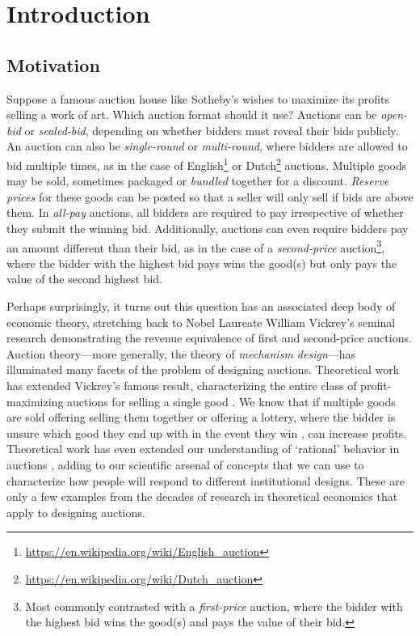 \chapter{Introduction}

\section{Motivation}

Suppose a famous auction house like Sotheby's wishes to maximize its profits selling a work of art. Which auction format should it use? Auctions can be \textit{open-bid} or \textit{sealed-bid}, depending on whether bidders must reveal their bids publicly. An auction can also be \textit{single-round} or \textit{multi-round}, where bidders are allowed to bid multiple times, as in the case of English\footnote{\url{https://en.wikipedia.org/wiki/English_auction}} or Dutch\footnote{\url{https://en.wikipedia.org/wiki/Dutch_auction}} auctions. Multiple goods may be sold, sometimes packaged or \textit{bundled} together for a discount. \textit{Reserve prices} for these goods can be posted so that a seller will only sell if bids are above them. In \textit{all-pay} auctions, all bidders are required to pay irrespective of whether they submit the winning bid. Additionally, auctions can even require bidders pay an amount different than their bid, as in the case of a \textit{second-price} auction\footnote{Most commonly contrasted with a \textit{first-price} auction, where the bidder with the highest bid wins the good(s) and pays the value of their bid.}, where the bidder with the highest bid pays wins the good(s) but only pays the value of the second highest bid.

Perhaps surprisingly, it turns out this question has an associated deep body of economic theory, stretching back to Nobel Laureate William Vickrey's \autocite*{vickrey1961} seminal research demonstrating the revenue equivalence of first and second-price auctions. Auction theory---more generally, the theory of \textit{mechanism design}---has illuminated many facets of the problem of designing auctions. Theoretical work has extended Vickrey's famous result, characterizing the entire class of profit-maximizing auctions for selling a single good \autocite{myerson1981optimal}. We know that if multiple goods are sold offering selling them together \autocite{adams1976} or offering a lottery, where the bidder is unsure which good they end up with in the event they win \autocite{thanassoulis2004}, can increase profits. Theoretical work has even extended our understanding of `rational' behavior in auctions \autocite{li2017}, adding to our scientific arsenal of concepts that we can use to characterize how people will respond to different institutional designs. These are only a few examples from the decades of research in theoretical economics that apply to designing auctions.


